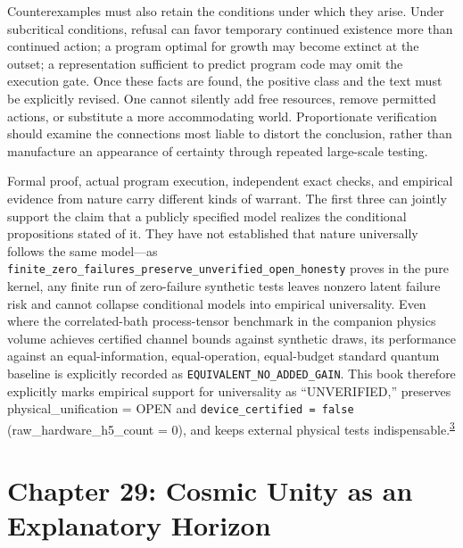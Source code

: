 \documentclass[
  english,
  11pt,
  oneside]{book}
\begin{document}
Counterexamples must also retain the conditions under which they arise. Under subcritical conditions, refusal can favor temporary continued existence more than continued action; a program optimal for growth may become extinct at the outset; a representation sufficient to predict program code may omit the execution gate. Once these facts are found, the positive class and the text must be explicitly revised. One cannot silently add free resources, remove permitted actions, or substitute a more accommodating world. Proportionate verification should examine the connections most liable to distort the conclusion, rather than manufacture an appearance of certainty through repeated large-scale testing.

\begingroup{}

Formal proof, actual program execution, independent exact checks, and empirical evidence from nature carry different kinds of warrant. The first three can jointly support the claim that a publicly specified model realizes the conditional propositions stated of it. They have not established that nature universally follows the same model---as \nolinkurl{finite_zero_failures_preserve_unverified_open_honesty} proves in the pure kernel, any finite run of zero-failure synthetic tests leaves nonzero latent failure risk and cannot collapse conditional models into empirical universality. Even where the correlated-bath process-tensor benchmark in the companion physics volume achieves certified channel bounds against synthetic draws, its performance against an equal-information, equal-operation, equal-budget standard quantum baseline is explicitly recorded as \texttt{EQUIVALENT\_NO\_ADDED\_GAIN}. This book therefore explicitly marks empirical support for universality as ``UNVERIFIED,'' preserves physical\_unification = OPEN and \texttt{device\_certified\ =\ false} (raw\_hardware\_h5\_count = 0), and keeps external physical tests indispensable.\textsuperscript{\hyperlink{ph-note-3}{3}}

\par\endgroup

\chapter{Chapter 29: Cosmic Unity as an Explanatory Horizon}\label{ph-ch-29}
\end{document}
